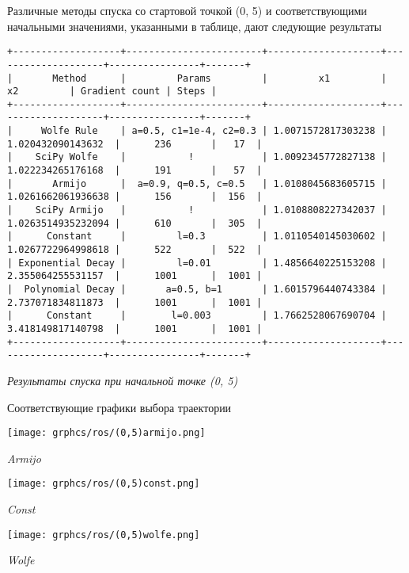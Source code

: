 \documentclass{article}
\begin{document}
Различные методы спуска со стартовой точкой (0, 5) и соответствующими начальными значениями, указанными в таблице, дают следующие результаты

\newpage

\begin{center}
{ \scriptsize
\begin{verbatim}
+-------------------+------------------------+--------------------+--------------------+----------------+-------+
|       Method      |         Params         |         x1         |         x2         | Gradient count | Steps |
+-------------------+------------------------+--------------------+--------------------+----------------+-------+
|     Wolfe Rule    | a=0.5, c1=1e-4, c2=0.3 | 1.0071572817303238 | 1.020432090143632  |      236       |   17  |
|    SciPy Wolfe    |           !            | 1.0092345772827138 | 1.022234265176168  |      191       |   57  |
|       Armijo      |  a=0.9, q=0.5, c=0.5   | 1.0108045683605715 | 1.0261662061936638 |      156       |  156  |
|    SciPy Armijo   |           !            | 1.0108808227342037 | 1.0263514935232094 |      610       |  305  |
|      Constant     |         l=0.3          | 1.0110540145030602 | 1.0267722964998618 |      522       |  522  |
| Exponential Decay |         l=0.01         | 1.4856640225153208 | 2.355064255531157  |      1001      |  1001 |
|  Polynomial Decay |       a=0.5, b=1       | 1.6015796440743384 | 2.737071834811873  |      1001      |  1001 |
|      Constant     |        l=0.003         | 1.7662528067690704 | 3.418149817140798  |      1001      |  1001 |
+-------------------+------------------------+--------------------+--------------------+----------------+-------+
\end{verbatim}
}
{ \it Результаты спуска при начальной точке (0, 5)}
\end{center}

Соответствующие графики выбора траектории

\begin{center}
    \texttt{[image: grphcs/ros/(0,5)armijo.png]}

    { \it Armijo}
\end{center}

\begin{center}
    \texttt{[image: grphcs/ros/(0,5)const.png]}

    { \it Const}
\end{center}

\begin{center}
    \texttt{[image: grphcs/ros/(0,5)wolfe.png]}

    { \it Wolfe}
\end{center}
\end{document}
